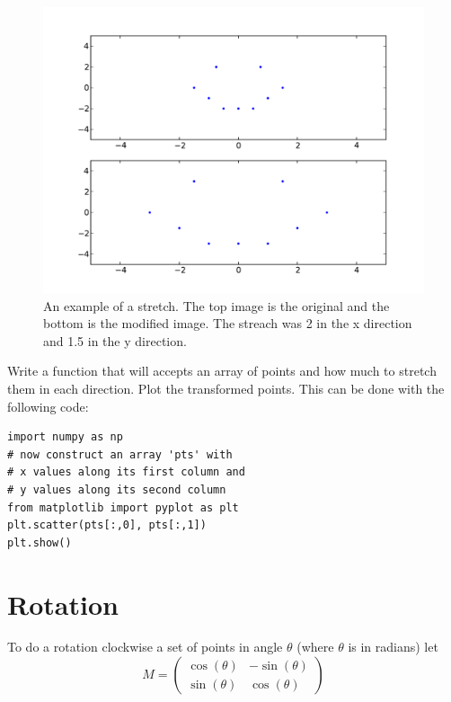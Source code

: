 \begin{figure}[H]
\includegraphics[scale = .5]{strench.pdf}
\caption{
An example of a stretch.
The top image is the original and the bottom is the modified image.
The streach was 2 in the x direction and 1.5 in the y direction.}
\end{figure}

\begin{problem}
Write a function that will accepts an array of points and how much to stretch them in each direction.
Plot the transformed points.
This can be done with the following code:
\begin{lstlisting}
import numpy as np
# now construct an array 'pts' with
# x values along its first column and
# y values along its second column
from matplotlib import pyplot as plt
plt.scatter(pts[:,0], pts[:,1])
plt.show()
\end{lstlisting}
\end{problem}

\section*{Rotation}
To do a rotation clockwise a set of points in angle $\theta$ (where $\theta$ is in radians) let
\[
M = \begin{pmatrix}
\cos(\theta) & -\sin(\theta) \\
\sin(\theta) & \cos(\theta) 
\end{pmatrix}
\]

